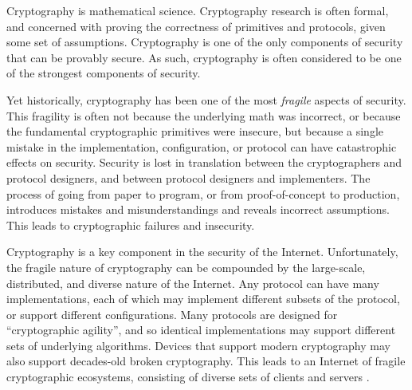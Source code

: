 
Cryptography is mathematical science. Cryptography research is often formal,
and concerned with proving the correctness of primitives and
protocols, given some set of assumptions. Cryptography is one of the only
components of security that can be provably secure. As such, cryptography is
often considered to be one of the strongest components of security.

Yet historically, cryptography has been one of the most \textit{fragile}
aspects of security. This fragility is often not because the underlying math
was incorrect, or because the fundamental cryptographic primitives were
insecure, but because a single mistake in the implementation, configuration,
or protocol can have catastrophic effects on security. Security is lost in
translation between the cryptographers and protocol designers, and between
protocol designers and implementers. The process of going from paper to
program, or from proof-of-concept to production, introduces mistakes and
misunderstandings and reveals incorrect assumptions. This leads to
cryptographic failures and insecurity.


Cryptography is a key component in the security of the Internet.
Unfortunately, the fragile nature of cryptography can be compounded by the
large-scale, distributed, and diverse nature of the Internet. Any protocol
can have many implementations, each of which may implement different subsets
of the protocol, or support different configurations. Many protocols are
designed for ``cryptographic agility'', and so identical implementations may
support different sets of underlying algorithms. Devices that support modern
cryptography may also support decades-old broken cryptography. This leads to
an Internet of fragile cryptographic ecosystems, consisting of diverse sets
of clients and servers .


